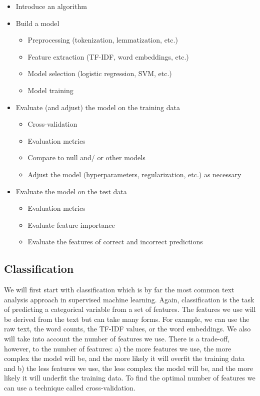 \documentclass[
  letterpaper,
]{latex/krantz}
\providecommand{\tightlist}{%
  \setlength{\itemsep}{0pt}\setlength{\parskip}{0pt}}\usepackage{longtable,booktabs,array}
\begin{document}
\begin{itemize}
\tightlist
\item
  Introduce an algorithm
\item
  Build a model

  \begin{itemize}
  \tightlist
  \item
    Preprocessing (tokenization, lemmatization, etc.)
  \item
    Feature extraction (TF-IDF, word embeddings, etc.)
  \item
    Model selection (logistic regression, SVM, etc.)
  \item
    Model training
  \end{itemize}
\item
  Evaluate (and adjust) the model on the training data

  \begin{itemize}
  \tightlist
  \item
    Cross-validation
  \item
    Evaluation metrics
  \item
    Compare to null and/ or other models
  \item
    Adjust the model (hyperparameters, regularization, etc.) as
    necessary
  \end{itemize}
\item
  Evaluate the model on the test data

  \begin{itemize}
  \tightlist
  \item
    Evaluation metrics
  \item
    Evaluate feature importance
  \item
    Evaluate the features of correct and incorrect predictions
  \end{itemize}
\end{itemize}

\hypertarget{pda-classification}{%
\subsection{Classification}\label{pda-classification}}

We will first start with classification which is by far the most common
text analysis approach in supervised machine learning. Again,
classification is the task of predicting a categorical variable from a
set of features. The features we use will be derived from the text but
can take many forms. For example, we can use the raw text, the word
counts, the TF-IDF values, or the word embeddings. We also will take
into account the number of features we use. There is a trade-off,
however, to the number of features: a) the more features we use, the
more complex the model will be, and the more likely it will overfit the
training data and b) the less features we use, the less complex the
model will be, and the more likely it will underfit the training data.
To find the optimal number of features we can use a technique called
cross-validation.
\end{document}
